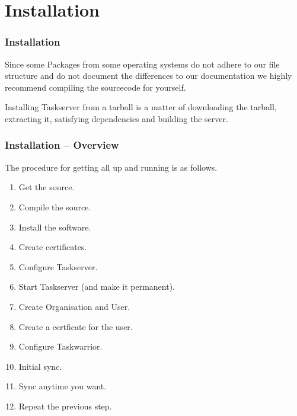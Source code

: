 \documentclass[t,handout]{beamer}
\begin{document}
\section{Installation}

\begin{frame}[fragile]\frametitle{Installation}
    \vfill
    Since some Packages from some operating systems do not adhere to our file structure and do not document the differences to our documentation we highly recommend compiling the sourcecode for yourself.

    Installing Taskserver from a tarball is a matter of downloading the tarball, extracting it, satisfying dependencies and building the server.
\end{frame}

\begin{frame}[fragile]\frametitle{Installation -- Overview}
    \vfill
    The procedure for getting all up and running is as follows.
    \begin{enumerate}
        \item Get the source.
        \item Compile the source.
        \item Install the software.
        \item Create certificates.
        \item Configure Taskserver.
        \item Start Taskserver (and make it permanent).
        \item Create Organisation and User.
        \item Create a certficate for the user.
        \item Configure Taskwarrior.
        \item Initial sync.
        \item Sync anytime you want.
        \item Repeat the previous step.
    \end{enumerate}
\end{frame}
\end{document}
